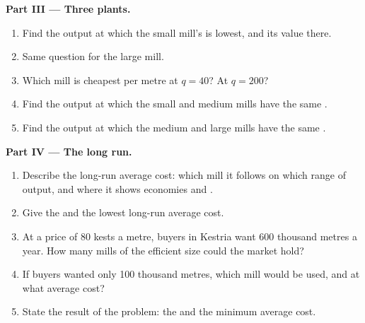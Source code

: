 \begin{problem}
\medskip
\noindent\textbf{Part III --- Three plants.}
\begin{enumerate}[resume]
\item Find the output at which the small mill's  is lowest, and its value there.
\item Same question for the large mill.
\item Which mill is cheapest per metre at $q = 40$? At $q = 200$?
\item Find the output at which the small and medium mills have the same .
\item Find the output at which the medium and large mills have the same .
\end{enumerate}

\medskip
\noindent\textbf{Part IV --- The long run.}
\begin{enumerate}[resume]
\item Describe the long-run average cost: which mill it follows on which range of output, and where it shows economies and .
\item Give the  and the lowest long-run average cost.
\item At a price of 80 kests a metre, buyers in Kestria want \num{600} thousand metres a year. How many mills of the efficient size could the market hold?
\item If buyers wanted only 100 thousand metres, which mill would be used, and at what average cost?
\item State the result of the problem: the  and the minimum average cost.
\end{enumerate}
\end{problem}
